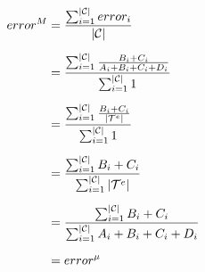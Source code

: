 \begin{equation} \label{error-macro}
\begin{split}
error^M
 & = \frac{\sum_{i=1}^{|\mathcal{C}|}{error_i}}  {|\mathcal{C}|} \\[6pt]
 & = \frac{\sum_{i=1}^{|\mathcal{C}|}{ \frac{B_i+C_i}{A_i+B_i+C_i+D_i} }} { \sum_{i=1}^{|\mathcal{C}|}{1} } \\[6pt]
 & = \frac{\sum_{i=1}^{|\mathcal{C}|}{ \frac{B_i+C_i}{|\mathcal{T}^e|} }}         { \sum_{i=1}^{|\mathcal{C}|}{1} } \\[6pt]
 & = \frac{\sum_{i=1}^{|\mathcal{C}|}{B_i+C_i}}                           { \sum_{i=1}^{|\mathcal{C}|}{|\mathcal{T}^e|} } \\[6pt]
 & = \frac{\sum_{i=1}^{|\mathcal{C}|}{B_i+C_i}}                           { \sum_{i=1}^{|\mathcal{C}|}{A_i+B_i+C_i+D_i} } \\[6pt]
 & = error^\mu
\end{split}
\end{equation}

